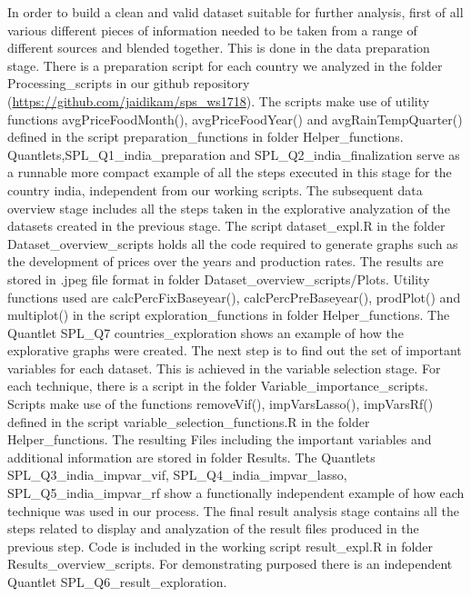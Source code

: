 \documentclass[12pt,a4paper,english]{article}
\begin{document}
In order to build a clean and valid dataset suitable for further analysis, first of all various different pieces of information needed to be taken from a range of different sources and blended together. This is done in the data preparation stage. There is a preparation script for each country we analyzed in the folder Processing\_scripts in our github repository (\url{https://github.com/jaidikam/sps_ws1718}). The scripts make use of utility functions avgPriceFoodMonth(), avgPriceFoodYear() and avgRainTempQuarter() defined in the script preparation\_functions in folder Helper\_functions. Quantlets,SPL\_Q1\_india\_preparation and SPL\_Q2\_india\_finalization serve as a runnable more compact example of all the steps executed in this stage for the country india, independent from our working scripts.
The subsequent data overview stage includes all the steps taken in the explorative analyzation of the datasets created in the previous stage. The script dataset\_expl.R in the folder Dataset\_overview\_scripts holds all the code required to generate graphs such as the development of prices over the years and production rates. The results are stored in .jpeg file format in folder Dataset\_overview\_scripts/Plots. Utility functions used are calcPercFixBaseyear(), calcPercPreBaseyear(), prodPlot() and multiplot() in the script exploration\_functions in folder Helper\_functions. The Quantlet SPL\_Q7 countries\_exploration shows an example of how the explorative graphs were created. 
The next step is to find out the set of important variables for each dataset. This is achieved in the variable selection stage. For each technique, there is a script in the folder Variable\_importance\_scripts. Scripts make use of the functions removeVif(), impVarsLasso(), impVarsRf() defined in the script variable\_selection\_functions.R in the folder Helper\_functions. The resulting Files including the important variables and additional information are stored in folder Results.
The Quantlets SPL\_Q3\_india\_impvar\_vif, SPL\_Q4\_india\_impvar\_lasso, SPL\_Q5\_india\_impvar\_rf show a functionally independent example of how each technique was used in our process.
The final result analysis stage contains all the steps related to display and analyzation of the result files produced in the previous step. Code is included in the working script result\_expl.R in folder Results\_overview\_scripts. For demonstrating purposed there is an independent Quantlet SPL\_Q6\_result\_exploration.
\end{document}
